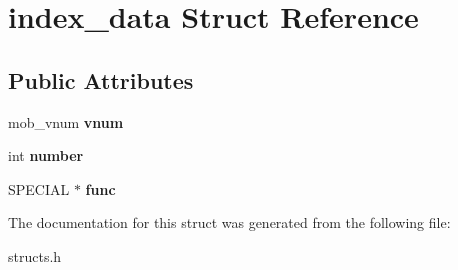 \hypertarget{structindex__data}{}\section{index\+\_\+data Struct Reference}
\label{structindex__data}
\subsection*{Public Attributes}
\begin{DoxyCompactItemize}
\item 
\mbox{\label{structindex__data_a8a7708efe2103fa3a0f473cd1067e8b5}} 
mob\+\_\+vnum {\bfseries vnum}
\item 
\mbox{\label{structindex__data_aea8675eeebccc5383ea0f994070d2f56}} 
int {\bfseries number}
\item 
\mbox{\label{structindex__data_a03a3c773a6f7919f9df238ac34b7dead}} 
S\+P\+E\+C\+I\+AL $\ast$ {\bfseries func}
\end{DoxyCompactItemize}


The documentation for this struct was generated from the following file\+:\begin{DoxyCompactItemize}
\item 
structs.\+h\end{DoxyCompactItemize}
